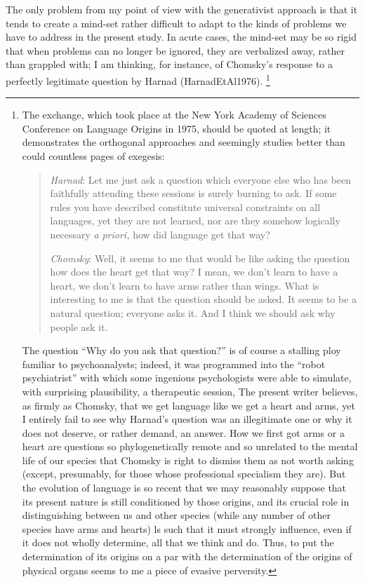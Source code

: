 The only problem from my point of view with the generativist approach is that it tends to create a mind-set rather difficult to adapt to the kinds of problems we have to address in the present study. In acute cases, the mind-set may be so rigid that when problems can no 
longer be ignored, they are verbalized away, rather than grappled with; I am thinking, for instance, of Chomsky's response to a perfectly legitimate question by Harnad (\citealt{57}{HarnadEtAl1976}).%
\footnote{\label{Fn3.1}The exchange, which took place at the New York Academy of Sciences Conference on Language Origins in 1975, should be quoted at length; it demonstrates the orthogonal approaches and seemingly studies better than could countless pages of exegesis:
	
\begin{quotation}
		\textit{Harnad}: Let me just ask a question which everyone else who has been faithfully attending these sessions is surely burning to ask. If some rules you have described constitute universal constraints on all languages, yet they are not learned, nor are they somehow logically necessary \textit{a} \textit{priori,} how did language get that way?
		
		\noindent\textit{Chomsky}: Well, it seems to me that would be like asking the question how does the heart get that way? I mean, we don't learn to have a heart, we don't learn to have arms rather than wings. What is interesting to me is that the question should be asked. It seems to be a natural question; everyone asks it. And I think we should ask why people ask it.
\end{quotation}
	
The question ``Why do you ask that question?'' is of course a stalling ploy familiar to psychoanalysts; indeed, it was programmed into the ``robot psychiatrist'' with which some ingenious psychologists were able to simulate, with surprising plausibility, a therapeutic session, The present writer believes, as firmly as Chomsky, that we get language like we get a heart and arms, yet I entirely fail to see why Harnad's question was an illegitimate one or why it does not deserve, or rather demand, an answer. How we first got arms or a heart are questions so phylo\-genetically remote and so unrelated to the mental life of our species that Chomsky is right to dismiss them as not worth asking (except, presumably, for those whose professional specialism they are). But the evolution of language is so recent that we may reasonably suppose that its present nature is still conditioned by those origins, and its crucial role in distinguishing between us and other species (while any number of other species have arms and hearts) ls such that it must strongly influence, even if it does not wholly determine, all that we think and do. Thus, to put the determination of its origins on a par with the determination of the origins of physical organs seems to me a piece of evasive perversity.} %
